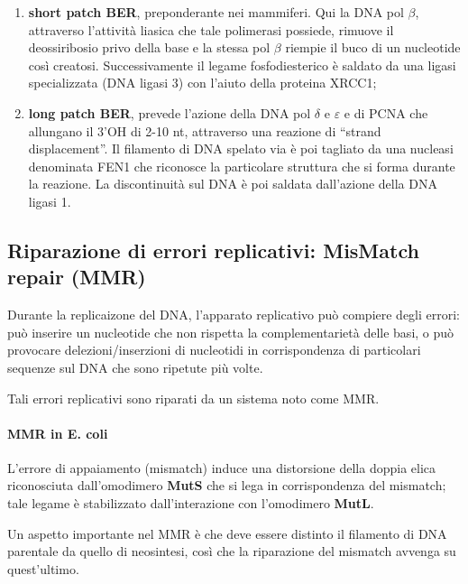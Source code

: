 \documentclass[11pt]{book}
\begin{document}
\begin{enumerate}
\def\labelenumi{\arabic{enumi}.}
\itemsep1pt\parskip0pt
\item
  \textbf{short patch BER}, preponderante nei mammiferi. Qui la DNA pol
  \(\beta\), attraverso l'attività liasica che tale polimerasi possiede,
  rimuove il deossiribosio privo della base e la stessa pol \(\beta\)
  riempie il buco di un nucleotide così creatosi. Successivamente il
  legame fosfodiesterico è saldato da una ligasi specializzata (DNA
  ligasi 3) con l'aiuto della proteina XRCC1;
\item
  \textbf{long patch BER}, prevede l'azione della DNA pol \(\delta\) e
  \(\varepsilon\) e di PCNA che allungano il 3'OH di 2-10 nt, attraverso
  una reazione di ``strand displacement''. Il filamento di DNA spelato
  via è poi tagliato da una nucleasi denominata FEN1 che riconosce la
  particolare struttura che si forma durante la reazione. La
  discontinuità sul DNA è poi saldata dall'azione della DNA ligasi 1.
\end{enumerate}

\subsection{Riparazione di errori replicativi: MisMatch repair
(MMR)}\label{riparazione-di-errori-replicativi-mismatch-repair-mmr}

Durante la replicaizone del DNA, l'apparato replicativo può compiere
degli errori: può inserire un nucleotide che non rispetta la
complementarietà delle basi, o può provocare delezioni/inserzioni di
nucleotidi in corrispondenza di particolari sequenze sul DNA che sono
ripetute più volte.

Tali errori replicativi sono riparati da un sistema noto come MMR.

\paragraph{MMR in E. coli}\label{mmr-in-e.-coli}

L'errore di appaiamento (mismatch) induce una distorsione della doppia
elica riconosciuta dall'omodimero \textbf{MutS} che si lega in
corrispondenza del mismatch; tale legame è stabilizzato dall'interazione
con l'omodimero \textbf{MutL}.

Un aspetto importante nel MMR è che deve essere distinto il filamento di
DNA parentale da quello di neosintesi, così che la riparazione del
mismatch avvenga su quest'ultimo.
\end{document}
